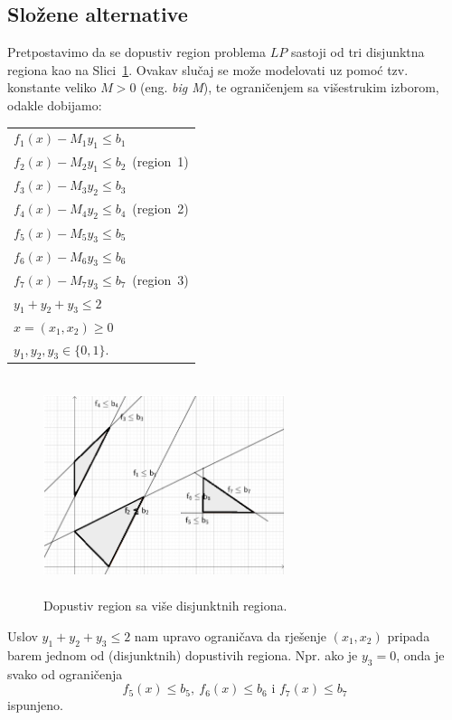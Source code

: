 \documentclass[b5paper, utf8, 11pt, colorlinks]{book}
\theoremstyle{definition}
\begin{document}
\subsection{Složene alternative}
Pretpostavimo da se dopustiv region problema $LP$ sastoji od tri disjunktna regiona kao na Slici~\ref{fig:compound_regions}. Ovakav slučaj se može modelovati uz pomoć tzv. konstante veliko $M>0$ (eng. \emph{big M}), te  ograničenjem sa višestrukim izborom, odakle dobijamo:
\begin{center}
	\begin{tabular}{l }
		$f_1(x) - M_1 y_1 \leq b_1$ \\
		$f_2(x) - M_2 y_1 \leq b_2$\ (\mbox{region 1}) \\ \hline
		$f_3(x) - M_3 y_2 \leq b_3$ \\ 
		$f_4(x) - M_4 y_2 \leq b_4$\ (\mbox{region 2})\\  \hline 
		$f_5(x) - M_5 y_3 \leq b_5$ \\
		$f_6(x) - M_6 y_3 \leq b_6 $\\
		$f_7(x) - M_7 y_3 \leq b_7$\  (\mbox{region 3}) \\ \hline
		$y_1 + y_2 + y_3 \leq 2$ \\
		$x=(x_1, x_2) \geq 0$ \\
		$y_1, y_2, y_3 \in \{0, 1\}$.
	\end{tabular}
\end{center}
\begin{figure}[!ht]
	\centering
	\includegraphics[width=200pt, height=180pt]{compound.eps}
	\caption{Dopustiv region sa više disjunktnih regiona.}
	\label{fig:compound_regions}
\end{figure}
Uslov $y_1 + y_2 + y_3 \leq 2$ nam upravo ograničava da rješenje $(x_1, x_2)$ pripada barem jednom od (disjunktnih) dopustivih regiona. Npr. ako je $y_3 = 0$, onda je svako od ograničenja $$f_5(x) \leq b_5, \ f_6(x) \leq b_6 \mbox{ i } f_7(x) \leq b_7$$
ispunjeno. 
\end{document}
